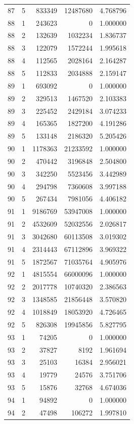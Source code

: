 \begin{longtable}{rrrrr}
87 & 5 & 833349 & 12487680 & 4.768796 \\
88 & 1 & 243623 & 0 & 1.000000 \\
88 & 2 & 132639 & 1032234 & 1.836737 \\
88 & 3 & 122079 & 1572244 & 1.995618 \\
88 & 4 & 112565 & 2028164 & 2.164287 \\
88 & 5 & 112833 & 2034888 & 2.159147 \\
89 & 1 & 693092 & 0 & 1.000000 \\
89 & 2 & 329513 & 1467520 & 2.103383 \\
89 & 3 & 225452 & 2429184 & 3.074233 \\
89 & 4 & 165365 & 1827200 & 4.191286 \\
89 & 5 & 133148 & 2186320 & 5.205426 \\
90 & 1 & 1178363 & 21233592 & 1.000000 \\
90 & 2 & 470442 & 3196848 & 2.504800 \\
90 & 3 & 342250 & 5523456 & 3.442989 \\
90 & 4 & 294798 & 7360608 & 3.997188 \\
90 & 5 & 267434 & 7981056 & 4.406182 \\
91 & 1 & 9186769 & 53947008 & 1.000000 \\
91 & 2 & 4532609 & 52032556 & 2.026817 \\
91 & 3 & 3042680 & 60113508 & 3.019302 \\
91 & 4 & 2314443 & 67112896 & 3.969322 \\
91 & 5 & 1872567 & 71035764 & 4.905976 \\
92 & 1 & 4815554 & 66000096 & 1.000000 \\
92 & 2 & 2017778 & 10740320 & 2.386563 \\
92 & 3 & 1348585 & 21856448 & 3.570820 \\
92 & 4 & 1018849 & 18053920 & 4.726465 \\
92 & 5 & 826308 & 19945856 & 5.827795 \\
93 & 1 & 74205 & 0 & 1.000000 \\
93 & 2 & 37827 & 8192 & 1.961694 \\
93 & 3 & 25103 & 16384 & 2.956021 \\
93 & 4 & 19779 & 24576 & 3.751706 \\
93 & 5 & 15876 & 32768 & 4.674036 \\
94 & 1 & 94892 & 0 & 1.000000 \\
94 & 2 & 47498 & 106272 & 1.997810 \\

\end{longtable}
